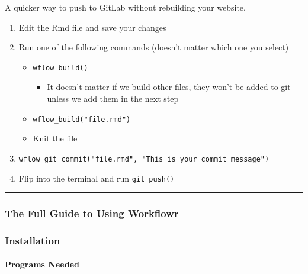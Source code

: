 \documentclass[openany]{article}
\providecommand{\tightlist}{%
  \setlength{\itemsep}{0pt}\setlength{\parskip}{0pt}}
\let\oldparagraph\paragraph
\renewcommand{\paragraph}[1]{\oldparagraph{#1}\mbox{}}
\begin{document}
A quicker way to push to GitLab without rebuilding your website.

\begin{enumerate}
\def\labelenumi{\arabic{enumi}.}
\tightlist
\item
  Edit the Rmd file and save your changes
\item
  Run one of the following commands (doesn't matter which one you select)

  \begin{itemize}
  \tightlist
  \item
    \texttt{wflow\_build()}

    \begin{itemize}
    \tightlist
    \item
      It doesn't matter if we build other files, they won't be added to git unless we add them in the next step
    \end{itemize}
  \item
    \texttt{wflow\_build("file.rmd")}
  \item
    Knit the file
  \end{itemize}
\item
  \texttt{wflow\_git\_commit("file.rmd",\ "This\ is\ your\ commit\ message")}
\item
  Flip into the terminal and run \texttt{git\ push()}
\end{enumerate}

\begin{center}\rule{0.5\linewidth}{\linethickness}\end{center}

\hypertarget{the-full-guide-to-using-workflowr}{%
\subsubsection*{The Full Guide to Using Workflowr}\label{the-full-guide-to-using-workflowr}}

\hypertarget{installation}{%
\subsubsection{Installation}\label{installation}}

\hypertarget{programs-needed}{%
\paragraph{Programs Needed}\label{programs-needed}}
\end{document}
